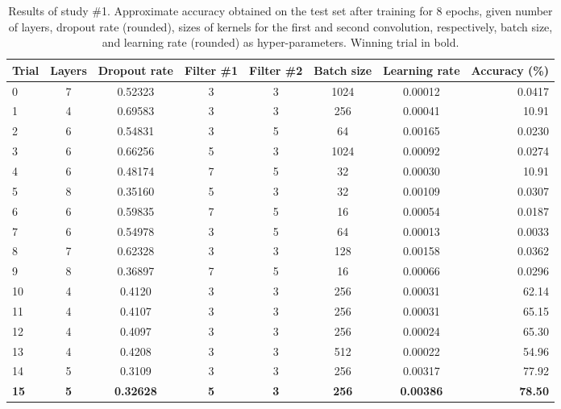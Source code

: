 \documentclass[british,12p]{article}
\begin{document}
    \begin{table}
    \begin{tabular}{l||c|c|c|c|c|c||r}
  		Trial & Layers & Dropout rate & Filter \#1 & Filter \#2 & Batch size & Learning rate & Accuracy (\%) \\
  		\hline\hline
  		0 & 7 & 0.52323 & 3 & 3 & 1024 & 0.00012 & 0.0417\\\hline
  		1 & 4 & 0.69583 & 3 & 3 & 256 & 0.00041 & 10.91\\\hline
  		2 & 6 & 0.54831 & 3 & 5 & 64 & 0.00165 & 0.0230\\\hline
  		3 & 6 & 0.66256 & 5 & 3 & 1024 & 0.00092 & 0.0274\\\hline
  		4 & 6 & 0.48174 & 7 & 5 & 32 & 0.00030 & 10.91\\\hline
  		5 & 8 & 0.35160 & 5 & 3 & 32 & 0.00109 & 0.0307\\\hline
  		6 & 6 & 0.59835 & 7 & 5 & 16 & 0.00054 & 0.0187\\\hline
  		7 & 6 & 0.54978 & 3 & 5 & 64 & 0.00013 & 0.0033\\\hline
  		8 & 7 & 0.62328 & 3 & 3 & 128 & 0.00158 & 0.0362\\\hline
  		9 & 8 & 0.36897 & 7 & 5 & 16 & 0.00066 & 0.0296\\\hline
  		10 & 4 & 0.4120 & 3 & 3 & 256 & 0.00031& 62.14\\\hline
  		11 & 4 & 0.4107 & 3 & 3 & 256 & 0.00031 & 65.15\\\hline
  		12 & 4 & 0.4097 & 3 & 3 & 256 & 0.00024& 65.30\\\hline
  		13 & 4 & 0.4208 & 3 & 3 & 512 & 0.00022 & 54.96\\\hline
  		14 & 5 & 0.3109 & 3 & 3 & 256 & 0.00317& 77.92 \\\hline
  		\textbf{15} & \textbf{5} & \textbf{0.32628} & \textbf{5} & \textbf{3} & \textbf{256} & \textbf{0.00386} & \textbf{78.50}
  		 
	\end{tabular}
	\caption{Results of study \#1. Approximate accuracy obtained on the test set after training for 8 epochs, given number of layers, dropout rate (rounded), sizes of kernels for the first and second convolution, respectively, batch size, and learning rate (rounded) as hyper-parameters. Winning trial in bold.}
	\label{tab-res1}
	 \end{table}
	 
\end{document}

